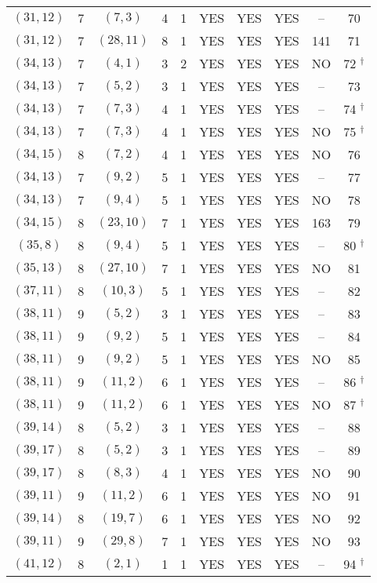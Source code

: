\begin{longtable}{|c|c|c|c|c|c|c|c|c|c|}
$(31, 12)$ & 7 & $(7, 3)$ & 4 & 1 & YES & YES & YES & -- & 70\\
$(31, 12)$ & 7 & $(28, 11)$ & 8 & 1 & YES & YES & YES & 141 & 71\\
$(34, 13)$ & 7 & $(4, 1)$ & 3 & 2 & YES & YES & YES & NO & 72 ${}^\dagger$\\
$(34, 13)$ & 7 & $(5, 2)$ & 3 & 1 & YES & YES & YES & -- & 73\\
$(34, 13)$ & 7 & $(7, 3)$ & 4 & 1 & YES & YES & YES & -- & 74 ${}^\dagger$\\
$(34, 13)$ & 7 & $(7, 3)$ & 4 & 1 & YES & YES & YES & NO & 75 ${}^\dagger$\\
$(34, 15)$ & 8 & $(7, 2)$ & 4 & 1 & YES & YES & YES & NO & 76\\
$(34, 13)$ & 7 & $(9, 2)$ & 5 & 1 & YES & YES & YES & -- & 77\\
$(34, 13)$ & 7 & $(9, 4)$ & 5 & 1 & YES & YES & YES & NO & 78\\
$(34, 15)$ & 8 & $(23, 10)$ & 7 & 1 & YES & YES & YES & 163 & 79\\
$(35, 8)$ & 8 & $(9, 4)$ & 5 & 1 & YES & YES & YES & -- & 80 ${}^\dagger$\\
$(35, 13)$ & 8 & $(27, 10)$ & 7 & 1 & YES & YES & YES & NO & 81\\
$(37, 11)$ & 8 & $(10, 3)$ & 5 & 1 & YES & YES & YES & -- & 82\\
$(38, 11)$ & 9 & $(5, 2)$ & 3 & 1 & YES & YES & YES & -- & 83\\
$(38, 11)$ & 9 & $(9, 2)$ & 5 & 1 & YES & YES & YES & -- & 84\\
$(38, 11)$ & 9 & $(9, 2)$ & 5 & 1 & YES & YES & YES & NO & 85\\
$(38, 11)$ & 9 & $(11, 2)$ & 6 & 1 & YES & YES & YES & -- & 86 ${}^\dagger$\\
$(38, 11)$ & 9 & $(11, 2)$ & 6 & 1 & YES & YES & YES & NO & 87 ${}^\dagger$\\
$(39, 14)$ & 8 & $(5, 2)$ & 3 & 1 & YES & YES & YES & -- & 88\\
$(39, 17)$ & 8 & $(5, 2)$ & 3 & 1 & YES & YES & YES & -- & 89\\
$(39, 17)$ & 8 & $(8, 3)$ & 4 & 1 & YES & YES & YES & NO & 90\\
$(39, 11)$ & 9 & $(11, 2)$ & 6 & 1 & YES & YES & YES & NO & 91\\
$(39, 14)$ & 8 & $(19, 7)$ & 6 & 1 & YES & YES & YES & NO & 92\\
$(39, 11)$ & 9 & $(29, 8)$ & 7 & 1 & YES & YES & YES & NO & 93\\
$(41, 12)$ & 8 & $(2, 1)$ & 1 & 1 & YES & YES & YES & -- & 94 ${}^\dagger$\\

\end{longtable}
